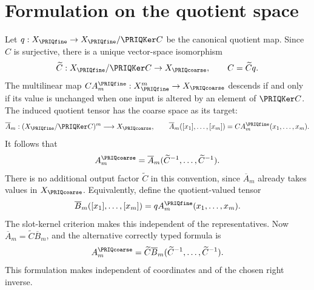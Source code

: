 \documentclass[11pt,oneside,openany]{book}
\numberwithin{equation}{section}
\begin{document}
\section{Formulation on the quotient space}\label{PRIQ:app:quotient}
Let $q:X_{\PRIQfine}\to X_{\PRIQfine}/\PRIQKer C$ be the canonical quotient map. Since $C$ is surjective, there is a unique vector-space isomorphism
\[
\widetilde C:X_{\PRIQfine}/\PRIQKer C\to X_{\PRIQcoarse},\qquad C=\widetilde Cq.
\]
The multilinear map $CA_m^{\PRIQfine}:X_{\PRIQfine}^m\to X_{\PRIQcoarse}$ descends if and only if its value is unchanged when one input is altered by an element of $\PRIQKer C$. The induced quotient tensor has the coarse space as its target:
\[
\overline A_m:(X_{\PRIQfine}/\PRIQKer C)^m\longrightarrow X_{\PRIQcoarse},\qquad
\overline A_m([x_1],\ldots,[x_m])=CA_m^{\PRIQfine}(x_1,\ldots,x_m).
\]
It follows that
\[
A_m^{\PRIQcoarse}=\overline A_m(\widetilde C^{-1},\ldots,\widetilde C^{-1}).
\]
There is no additional output factor $\widetilde C$ in this convention, since $\overline A_m$ already takes values in $X_{\PRIQcoarse}$.
Equivalently, define the quotient-valued tensor
\[
\overline B_m([x_1],\ldots,[x_m])=qA_m^{\PRIQfine}(x_1,\ldots,x_m).
\]
The slot-kernel criterion makes this independent of the representatives. Now $\overline A_m=\widetilde C\overline B_m$, and the alternative correctly typed formula is
\[
A_m^{\PRIQcoarse}=\widetilde C\overline B_m(\widetilde C^{-1},\ldots,\widetilde C^{-1}).
\]
This formulation makes  independent of coordinates and of the chosen right inverse.
\end{document}
